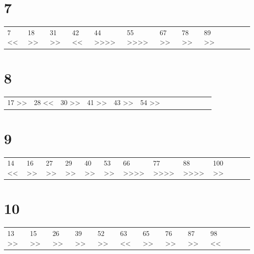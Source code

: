 \documentclass[11pt]{article}
\begin{document}
\section{7}
\label{sec-9}
\begin{center}
\begin{tabular}{lllllllllllll}
7 << & 18 >> & 31 >> & 42 << & 44 >>>> & 55 >>>> & 67 >> & 78 >> & 89 >> &  &  &  & \\
\end{tabular}
\end{center}
\section{8}
\label{sec-10}
\begin{center}
\begin{tabular}{lllllllllllll}
17 >> & 28 << & 30 >> & 41 >> & 43 >> & 54 >> &  &  &  &  &  &  & \\
\end{tabular}
\end{center}
\section{9}
\label{sec-11}
\begin{center}
\begin{tabular}{lllllllllllll}
14 << & 16 >> & 27 >> & 29 >> & 40 >> & 53 >> & 66 >>>> & 77 >>>> & 88 >>>> & 100 >> &  &  & \\
\end{tabular}
\end{center}
\section{10}
\label{sec-12}
\begin{center}
\begin{tabular}{lllllllllllll}
13 >> & 15 >> & 26 >> & 39 >> & 52 >> & 63 << & 65 >> & 76 >> & 87 >> & 98 << &  &  & \\
\end{tabular}
\end{center}
\end{document}

